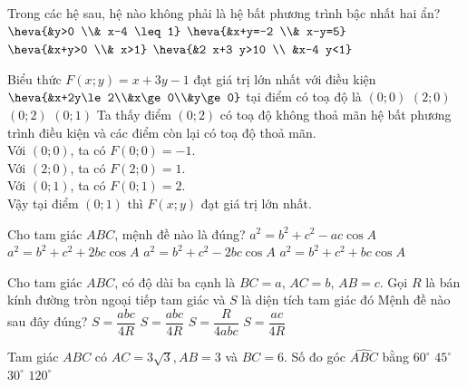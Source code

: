 \begin{ex}%
	Trong các hệ sau, hệ nào không phải là hệ bất phương trình bậc nhất hai ẩn?
	\choice
	{$\heva{&y>0 \\& x-4 \leq 1}$}
	{\True $\heva{&x+y=-2 \\& x-y=5}$}
	{$\heva{&x+y>0 \\& x>1}$}
	{$\heva{&2 x+3 y>10 \\ &x-4 y<1}$}
\end{ex}

\begin{ex}%
	Biểu thức $F(x;y)=x+3y-1$ đạt giá trị lớn nhất với điều kiện $\heva{&x+2y\le 2\\&x\ge 0\\&y\ge 0}$ tại điểm có toạ độ là
	\choice
	{$(0;0)$}
	{$(2;0)$}
	{$(0;2)$}
	{\True $(0;1)$}
	\loigiai
	{Ta thấy điểm $(0;2)$ có toạ độ không thoả mãn hệ bất phương trình điều kiện và các điểm còn lại có toạ độ thoả mãn.\\
		Với $(0;0)$, ta có $F(0;0)=-1$.\\
		Với $(2;0)$, ta có $F(2;0)=1$.\\
		Với $(0;1)$, ta có $F(0;1)=2$.\\
		Vậy tại điểm $(0;1)$ thì $F(x;y)$ đạt giá trị lớn nhất.}
\end{ex}

\begin{ex}%
	Cho tam giác $ABC$, mệnh đề nào là đúng?
	\choice
	{$a^2=b^2+c^2-ac\cos A$}
	{$a^2=b^2+c^2+2bc\cos A$}
	{\True $a^2=b^2+c^2-2bc\cos A$}
	{$a^2=b^2+c^2+bc\cos A$}
\end{ex}

\begin{ex}%
	Cho tam giác $ABC$, có độ dài ba cạnh là $BC=a$, $AC=b$, $AB=c$. Gọi $R$ là bán kính đường tròn ngoại tiếp tam giác và $S$ là diện tích tam giác đó Mệnh đề nào sau đây đúng?
	\choice
	{\True $S=\dfrac{abc}{4R}$}
	{$S=\dfrac{abc}{4R}$}
	{$S=\dfrac{R}{4abc}$}
	{$S=\dfrac{ac}{4R}$}
\end{ex}

\begin{ex}%
	Tam giác $ ABC $ có $ AC=3\sqrt{3},AB=3 $ và $ BC=6. $ Số đo góc $ \widehat{ABC} $ bằng
	\choice
	{\True $ 60^{\circ} $}
	{$ 45^{\circ} $}
	{$ 30^{\circ} $}
	{$ 120^{\circ} $}

\end{ex}

